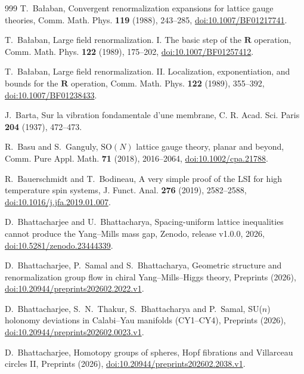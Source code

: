 \documentclass[aps,prd,twocolumn,superscriptaddress,nofootinbib,longbibliography,floatfix,amsmath,amssymb,10pt]{revtex4-2}
\theoremstyle{definition}
\theoremstyle{remark}
\newcommand{\SO}{\mathrm{SO}}
\begin{document}
\begin{thebibliography}{999}
T.~Ba{\l}aban, Convergent renormalization expansions for lattice gauge
theories, Comm. Math. Phys. \textbf{119} (1988), 243--285,
\href{https://doi.org/10.1007/BF01217741}{doi:10.1007/BF01217741}.

T.~Ba{\l}aban, Large field renormalization. I. The basic step of the
$\mathbf R$ operation, Comm. Math. Phys. \textbf{122} (1989), 175--202,
\href{https://doi.org/10.1007/BF01257412}{doi:10.1007/BF01257412}.

T.~Ba{\l}aban, Large field renormalization. II. Localization,
exponentiation, and bounds for the $\mathbf R$ operation, Comm. Math. Phys.
\textbf{122} (1989), 355--392,
\href{https://doi.org/10.1007/BF01238433}{doi:10.1007/BF01238433}.

J.~Barta, Sur la vibration fondamentale d'une membrane, C. R. Acad. Sci.
Paris \textbf{204} (1937), 472--473.

R.~Basu and S.~Ganguly, $\SO(N)$ lattice gauge theory, planar and beyond,
Comm. Pure Appl. Math. \textbf{71} (2018), 2016--2064,
\href{https://doi.org/10.1002/cpa.21788}{doi:10.1002/cpa.21788}.

R.~Bauerschmidt and T.~Bodineau, A very simple proof of the LSI for high
temperature spin systems, J. Funct. Anal. \textbf{276} (2019), 2582--2588,
\href{https://doi.org/10.1016/j.jfa.2019.01.007}{doi:10.1016/j.jfa.2019.01.007}.

D.~Bhattacharjee and U.~Bhattacharya, Spacing-uniform lattice inequalities
cannot produce the Yang--Mills mass gap, Zenodo, release v1.0.0, 2026,
\href{https://doi.org/10.5281/zenodo.23444339}{doi:10.5281/zenodo.23444339}.

D.~Bhattacharjee, P.~Samal and S.~Bhattacharya, Geometric structure and
renormalization group flow in chiral Yang--Mills--Higgs theory, Preprints
(2026), \href{https://doi.org/10.20944/preprints202602.2022.v1}
{doi:10.20944/preprints202602.2022.v1}.

D.~Bhattacharjee, S.~N.~Thakur, S.~Bhattacharya and P.~Samal, SU($n$)
holonomy deviations in Calabi--Yau manifolds (CY1--CY4), Preprints (2026),
\href{https://doi.org/10.20944/preprints202602.0023.v1}
{doi:10.20944/preprints202602.0023.v1}.

D.~Bhattacharjee, Homotopy groups of spheres, Hopf fibrations and Villarceau
circles II, Preprints (2026),
\href{https://doi.org/10.20944/preprints202602.2038.v1}
{doi:10.20944/preprints202602.2038.v1}.


\end{thebibliography}
\end{document}
